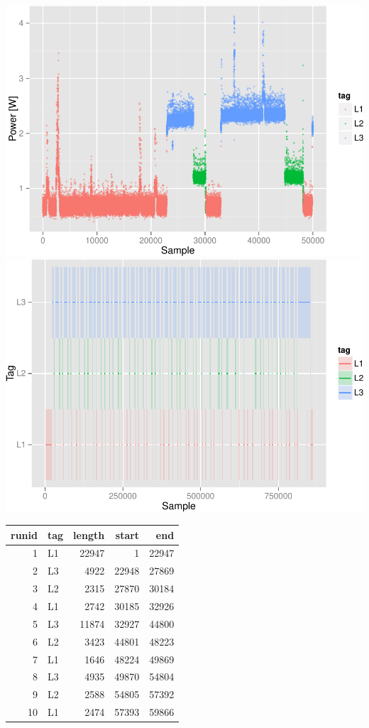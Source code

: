 \documentclass[]{article}
\begin{document}
\includegraphics{AnalysisProcedure_files/figure-latex/denoised-1.pdf}
\includegraphics{AnalysisProcedure_files/figure-latex/denoised-2.pdf}

\begin{longtable}[c]{@{}rlrrr@{}}
\toprule
runid & tag & length & start & end\tabularnewline
\midrule
\endhead
1 & L1 & 22947 & 1 & 22947\tabularnewline
2 & L3 & 4922 & 22948 & 27869\tabularnewline
3 & L2 & 2315 & 27870 & 30184\tabularnewline
4 & L1 & 2742 & 30185 & 32926\tabularnewline
5 & L3 & 11874 & 32927 & 44800\tabularnewline
6 & L2 & 3423 & 44801 & 48223\tabularnewline
7 & L1 & 1646 & 48224 & 49869\tabularnewline
8 & L3 & 4935 & 49870 & 54804\tabularnewline
9 & L2 & 2588 & 54805 & 57392\tabularnewline
10 & L1 & 2474 & 57393 & 59866\tabularnewline
\bottomrule
\end{longtable}
\end{document}
